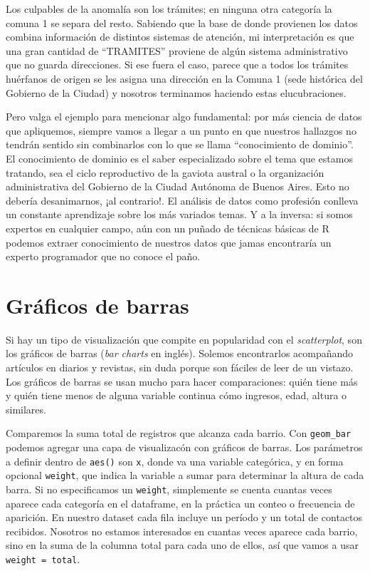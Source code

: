 \documentclass[]{book}
\begin{document}
Los culpables de la anomalía son los trámites; en ninguna otra categoría
la comuna 1 se separa del resto. Sabiendo que la base de donde provienen
los datos combina información de distintos sistemas de atención, mi
interpretación es que una gran cantidad de ``TRAMITES'' proviene de
algún sistema administrativo que no guarda direcciones. Si ese fuera el
caso, parece que a todos los trámites huérfanos de origen se les asigna
una dirección en la Comuna 1 (sede histórica del Gobierno de la Ciudad)
y nosotros terminamos haciendo estas elucubraciones.

Pero valga el ejemplo para mencionar algo fundamental: por más ciencia
de datos que apliquemos, siempre vamos a llegar a un punto en que
nuestros hallazgos no tendrán sentido sin combinarlos con lo que se
llama ``conocimiento de dominio''. El conocimiento de dominio es el
saber especializado sobre el tema que estamos tratando, sea el ciclo
reproductivo de la gaviota austral o la organización administrativa del
Gobierno de la Ciudad Autónoma de Buenos Aires. Esto no debería
desanimarnos, ¡al contrario!. El análisis de datos como profesión
conlleva un constante aprendizaje sobre los más variados temas. Y a la
inversa: si somos expertos en cualquier campo, aún con un puñado de
técnicas básicas de R podemos extraer conocimiento de nuestros datos que
jamas encontraría un experto programador que no conoce el paño.

\section{Gráficos de barras}\label{graficos-de-barras}

Si hay un tipo de visualización que compite en popularidad con el
\emph{scatterplot}, son los gráficos de barras (\emph{bar charts} en
inglés). Solemos encontrarlos acompañando artículos en diarios y
revistas, sin duda porque son fáciles de leer de un vistazo. Los
gráficos de barras se usan mucho para hacer comparaciones: quién tiene
más y quién tiene menos de alguna variable continua cómo ingresos, edad,
altura o similares.

Comparemos la suma total de registros que alcanza cada barrio. Con
\texttt{geom\_bar} podemos agregar una capa de visualizacón con gráficos
de barras. Los parámetros a definir dentro de \texttt{aes()} son
\texttt{x}, donde va una variable categórica, y en forma opcional
\texttt{weight}, que indica la variable a sumar para determinar la
altura de cada barra. Si no especificamos un \texttt{weight},
simplemente se cuenta cuantas veces aparece cada categoría en el
dataframe, en la práctica un conteo o frecuencia de aparición. En
nuestro dataset cada fila incluye un período y un total de contactos
recibidos. Nosotros no estamos interesados en cuantas veces aparece cada
barrio, sino en la suma de la columna total para cada uno de ellos, así
que vamos a usar \texttt{weight\ =\ total}.
\end{document}
